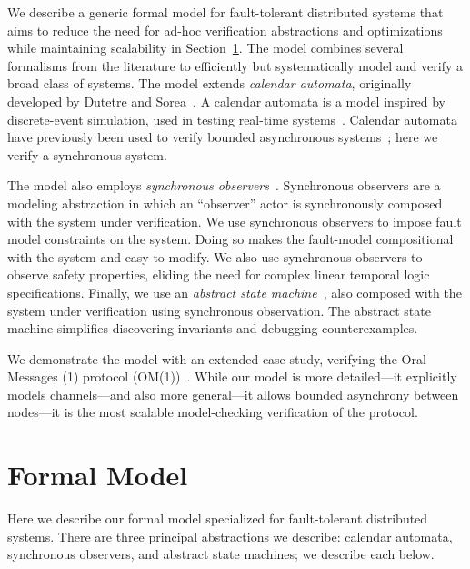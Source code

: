 \documentclass{IEEEtran/IEEEtran}
\newcommand{\lee}[1]{ } %
\newcommand{\lee}[1]{ {\color{blue}$<$lee: #1$>$} } %
\begin{document}
We describe a generic formal model for fault-tolerant distributed systems that aims to reduce the need for ad-hoc verification abstractions and optimizations while maintaining scalability in Section~\ref{sec:model}. The model combines several formalisms from the literature to efficiently but systematically model and verify a broad class of systems. The model extends \emph{calendar automata}, originally developed by Dutetre and Sorea~\cite{}. A calendar automata is a model inspired by discrete-event simulation, used in testing real-time systems~\cite{}. Calendar automata have previously been used to verify bounded asynchronous systems~\cite{}; here we verify a synchronous system.

The model also employs \emph{synchronous observers}~\cite{}. Synchronous observers are a modeling abstraction in which an ``observer'' actor is synchronously composed with the system under verification. We use synchronous observers to impose fault model constraints on the system. Doing so makes the fault-model compositional with the system and easy to modify. We also use synchronous observers to observe safety properties, eliding the need for complex linear temporal logic specifications. Finally, we use an \emph{abstract state machine}~\cite{}, also composed with the system under verification using synchronous observation. The abstract state machine simplifies discovering invariants and debugging counterexamples.

We demonstrate the model with an extended case-study, verifying the Oral Messages (1) protocol (OM(1))~\cite{}. While our model is more detailed---it explicitly models channels---and also more general---it allows bounded asynchrony between nodes---it is the most scalable model-checking verification of the protocol.

\lee{finish intro...}



\section{Formal Model}\label{sec:model}
Here we describe our formal model specialized for fault-tolerant distributed systems. There are three principal abstractions we describe: calendar automata, synchronous observers, and abstract state machines; we describe each below.
\end{document}

